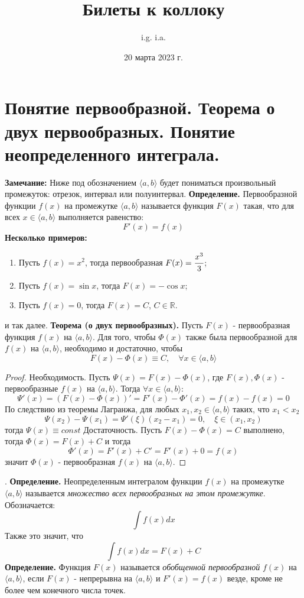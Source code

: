 \documentclass{article}
\title{\textbf{Билеты к коллоку}}
\author{i.g. i.a.}
\date{20 марта 2023 г.}
\newcommand*{\theorem}[2]{\textbf{Теорема #1. } #2 \newline}
\newcommand*{\definition}[1]{\textbf{Определение.} #1 \newline}
\newcommand*{\R}{\mathbb{R}}
\begin{document}
\tableofcontents
\maketitle

\section{Понятие первообразной. Теорема о двух первообразных. Понятие неопределенного интеграла.}

\textbf{Замечание: } Ниже под обозначением $\langle a, b \rangle$ будет пониматься произвольный промежуток: отрезок, интервал или полуинтервал.
\newline
\newline
\definition{Первообразной функции $f(x)$ на промежутке $\langle a, b \rangle$ называется функция $F(x)$ такая, что для всех $x \in \langle a, b \rangle$ выполняется равенство: }
$$
    F'(x) = f(x)
$$
\textbf{Несколько примеров: } 
\begin{enumerate}
    \item Пусть $f(x) = x^2$, тогда первообразная $F(x) = \cfrac{x^3}{3}$;
    \item Пусть $f(x) = \sin x$, тогда $F(x) = -\cos x$;
    \item Пусть $f(x) = 0$, тогда $F(x) = C$, $C \in \R$. 
\end{enumerate}
и так далее.
\newline 
\newline 
\theorem{(о двух первообразных)}{Пусть $F(x)$ - первообразная функция $f(x)$ на $\langle a, b \rangle$. Для того, чтобы $\Phi(x)$ также была первообразной для $f(x)$ на $\langle a, b \rangle$, необходимо и достаточно, чтобы}
$$
    F(x) - \Phi(x) \equiv C, \quad \forall x \in \langle a, b \rangle
$$
\begin{proof}
    Необходимость. Пусть $\Psi(x) = F(x) - \Phi(x)$, где $F(x), \Phi(x)$ - первообразные $f(x)$ на $\langle a, b \rangle$. Тогда $\forall x \in \langle a, b \rangle$:
    $$
        \Psi'(x) = (F(x) - \Phi(x))' = F'(x) - \Phi'(x) = f(x) - f(x) = 0
    $$
    По следствию из теоремы Лагранжа, для любых $x_1, x_2 \in \langle a,b \rangle$ таких, что $x_1 < x_2$
    $$
        \Psi(x_2) - \Psi(x_1) = \Psi'(\xi)(x_2 - x_1) = 0, \quad \xi \in (x_1, x_2) 
    $$
    тогда $\Psi(x) \equiv const$
    \newline
    \newline 
    Достаточность. Пусть $F(x) - \Phi(x) = C$ выполнено, тогда $\Phi(x) = F(x) + C$ и тогда
    $$
        \Phi'(x) = F'(x) + C' = F'(x) + 0 = f(x)
    $$
    значит $\Phi(x)$ - первообразная $f(x)$ на $\langle a, b \rangle$.
\end{proof}
.
\newline
\definition{Неопределенным интегралом функции $f(x)$ на промежутке $\langle a, b \rangle$ называется \textit{множество всех первообразных на этом промежутке}. Обозначается:}
$$
    \int f(x)dx
$$
Также это значит, что 
$$
\int f(x)dx = F(x) + C
$$
\definition{Функция $F(x)$ называется \textit{обобщенной первообразной} $f(x)$ на $\langle a, b \rangle$, если $F(x)$ - непрерывна на $\langle a, b \rangle$ и $F'(x) = f(x)$ везде, кроме не более чем конечного числа точек.}
\end{document}
